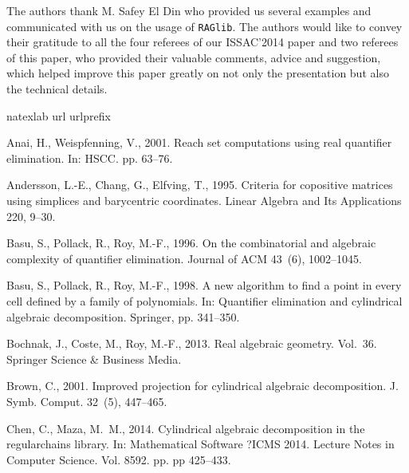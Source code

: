 \documentclass[amsthm]{elsart}
\def \RAGlib {{\tt RAGlib}}
\begin{document}
The authors  thank M. Safey El Din who provided us several examples and communicated with us on the usage of \RAGlib.
The authors would like to convey their gratitude to all the four referees of our ISSAC'2014 paper and two referees of this paper, who provided their valuable comments, advice and suggestion, which helped improve this paper greatly on not only the presentation but also the technical details.


\begin{thebibliography}{32}
\expandafter\ifx\csname natexlab\endcsname\relax\def\natexlab#1{#1}\fi
\expandafter\ifx\csname url\endcsname\relax
  \def\url#1{\texttt{#1}}\fi
\expandafter\ifx\csname urlprefix\endcsname\relax\def\urlprefix{URL }\fi

Anai, H., Weispfenning, V., 2001. Reach set computations using real quantifier
  elimination. In: HSCC. pp. 63--76.

Andersson, L.-E., Chang, G., Elfving, T., 1995. Criteria for copositive
  matrices using simplices and barycentric coordinates. Linear Algebra and Its
  Applications 220, 9--30.

Basu, S., Pollack, R., Roy, M.-F., 1996. On the combinatorial and algebraic
  complexity of quantifier elimination. Journal of ACM 43~(6), 1002--1045.

Basu, S., Pollack, R., Roy, M.-F., 1998. A new algorithm to find a point in
  every cell defined by a family of polynomials. In: Quantifier elimination and
  cylindrical algebraic decomposition. Springer, pp. 341--350.

Bochnak, J., Coste, M., Roy, M.-F., 2013. Real algebraic geometry. Vol.~36.
  Springer Science \& Business Media.

Brown, C., 2001. Improved projection for cylindrical algebraic decomposition.
  J. Symb. Comput. 32~(5), 447--465.

Chen, C., Maza, M.~M., 2014. Cylindrical algebraic decomposition in the
  regularchains library. In: Mathematical Software ?ICMS 2014. Lecture Notes in
  Computer Science. Vol. 8592. pp. pp 425--433.


\end{thebibliography}
\end{document}
